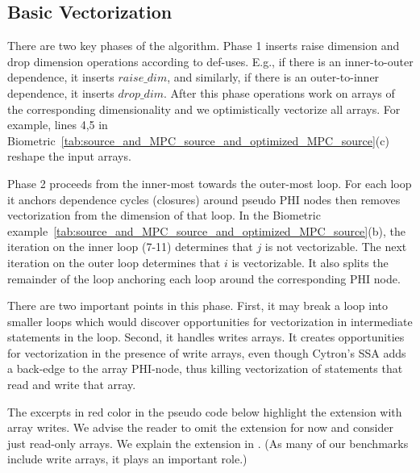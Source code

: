 \subsection{Basic Vectorization}
\label{sec:basic_vectorization}


There are two key phases of the algorithm. Phase 1 inserts raise dimension and drop dimension 
operations according to def-uses. E.g., if there is an inner-to-outer dependence, it inserts $\mathit{raise\_dim}$,
and similarly, if there is an outer-to-inner dependence, it inserts $\mathit{drop\_dim}$. After this phase operations work
on arrays of the corresponding dimensionality and we optimistically vectorize all arrays. For example, 
lines 4,5 in Biometric~\ref{tab:source_and_MPC_source_and_optimized_MPC_source}(c) reshape the input arrays. 

Phase 2 proceeds from the inner-most towards the outer-most loop. For each loop it anchors dependence cycles (closures) 
around pseudo PHI nodes then removes vectorization from the dimension of that loop. In the 
Biometric example~\ref{tab:source_and_MPC_source_and_optimized_MPC_source}(b), the iteration on the inner loop (7-11)
determines that $j$ is not vectorizable. The next iteration on the outer loop determines that $i$ is vectorizable. It also 
splits the remainder of the loop anchoring each loop around the corresponding PHI node. 

There are two important points in this 
phase. First, it may break a loop into smaller loops which would discover opportunities 
for vectorization in intermediate statements in the loop. Second, it handles writes arrays. 
It creates opportunities for vectorization in the presence of write arrays, even though 
Cytron's SSA adds a back-edge to the array PHI-node, thus killing vectorization of statements
that read and write that array.

The excerpts in {\color{red} red} color in the pseudo code below highlight the extension 
with array writes. We advise the reader to omit the extension for now and consider just read-only
arrays. We explain the extension in . 
(As many of our benchmarks include write arrays, it plays an important role.)


